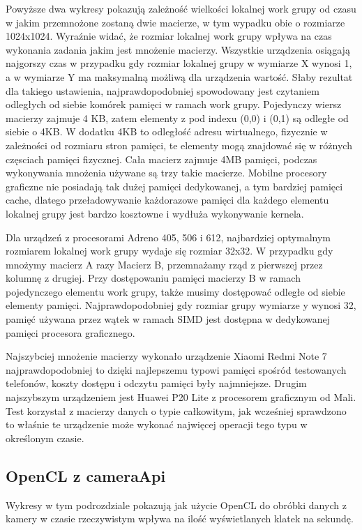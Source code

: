 Powyższe dwa wykresy pokazują zależność wielkości lokalnej work grupy od czasu w jakim przemnożone zostaną dwie macierze, w tym wypadku obie o rozmiarze 1024x1024. Wyraźnie widać, że rozmiar lokalnej work grupy wpływa na czas wykonania zadania jakim jest mnożenie macierzy. Wszystkie urządzenia osiągają najgorszy czas w przypadku gdy rozmiar lokalnej grupy w wymiarze X wynosi 1, a w wymiarze Y ma maksymalną możliwą dla urządzenia wartość. Słaby rezultat dla takiego ustawienia, najprawdopodobniej spowodowany jest czytaniem odległych od siebie komórek pamięci w ramach work grupy. Pojedynczy wiersz macierzy zajmuje 4 KB, zatem elementy z pod indexu (0,0) i (0,1) są odległe od siebie o 4KB. W dodatku 4KB to odległość adresu wirtualnego, fizycznie w zależności od rozmiaru stron pamięci, te elementy mogą znajdować się w różnych częsciach pamięci fizycznej. Cała macierz zajmuje 4MB pamięci, podczas wykonywania mnożenia używane są trzy takie macierze. Mobilne procesory graficzne nie posiadają tak dużej  pamięci dedykowanej, a tym bardziej pamięci cache, dlatego przeładowywanie każdorazowe pamięci dla każdego elementu lokalnej grupy jest bardzo kosztowne i wydłuża wykonywanie kernela. 

Dla urządzeń z procesorami Adreno 405, 506 i 612, najbardziej optymalnym rozmiarem lokalnej work grupy wydaje się rozmiar 32x32. W przypadku gdy mnożymy macierz A razy Macierz B, przemnażamy rząd z pierwszej przez kolumnę z drugiej. Przy dostępowaniu pamięci macierzy B w ramach pojedynczego elementu work grupy, także musimy dostępować odległe od siebie elementy pamięci. Najprawdopodobniej gdy rozmiar grupy  wymiarze y wynosi 32, pamięć używana przez wątek w ramach SIMD jest dostępna w dedykowanej pamięci procesora graficznego. 

Najszybciej mnożenie macierzy wykonało urządzenie Xiaomi Redmi Note 7 najprawdopodobniej to dzięki najlepszemu typowi pamięci spośród testowanych telefonów, koszty dostępu i odczytu pamięci były najmniejsze. Drugim najszybszym urządzeniem jest Huawei P20 Lite z procesorem graficznym od Mali. Test korzystał z macierzy danych o typie całkowitym, jak wcześniej sprawdzono to właśnie te urządzenie może wykonać najwięcej operacji tego typu w określonym czasie.
\subsection[OpenCL z cameraApi]{OpenCL z cameraApi}
Wykresy w tym podrozdziale pokazują jak użycie OpenCL do obróbki danych z kamery w czasie rzeczywistym wpływa na ilość wyświetlanych klatek na sekundę.

